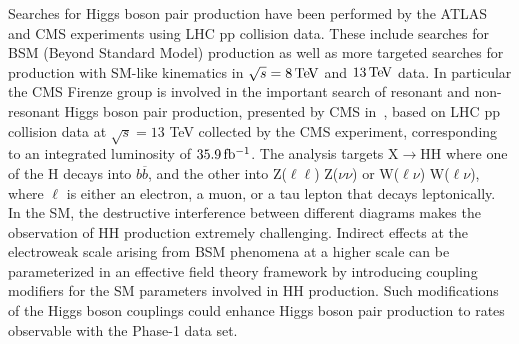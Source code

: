 \documentclass[a4paper,11pt,english]{article}
\begin{document}
\begin{description}[style=unboxed,leftmargin=.2cm]
\item[Analysis on current CMS data set: Higgs boson pair production.] Searches for Higgs boson pair production have been performed by the ATLAS and CMS experiments using LHC pp collision data. These include searches for BSM (Beyond Standard Model) production as well as more targeted searches for production with SM-like kinematics in $\sqrt{s} = 8{\rm \, Te\kern-0.125em V}$ and $13{\rm \, Te\kern-0.125em V}$ data. 
In particular the CMS Firenze group is involved in the important search of resonant and non-resonant Higgs boson pair production, presented by CMS in~\cite{Analysis}, based on LHC pp collision data at $\sqrt{s}=13$ TeV collected by the CMS experiment, corresponding to an integrated luminosity of $35.9{\rm \, fb^{-1}}$. The analysis targets $\mathrm{X \rightarrow HH}$ where one of the H decays into $b\overline{b}$, and the other into Z($\ell\ell$) Z($\nu\nu$) or W($\ell\nu$) W($\ell\nu$), where $\ell$ is either an electron, a muon, or a tau lepton that decays leptonically. 
 In the SM, the destructive interference between different diagrams makes the observation of HH production extremely challenging.
Indirect effects at the electroweak scale arising from BSM phenomena at a higher scale can be parameterized in an effective field theory framework by introducing coupling modifiers for the SM parameters involved in HH production. %
 Such modifications of the Higgs boson couplings could enhance Higgs boson pair production to rates observable with the Phase-1 data set.  
\begin{siderules}
\end{siderules}
\end{description}
\end{document}
